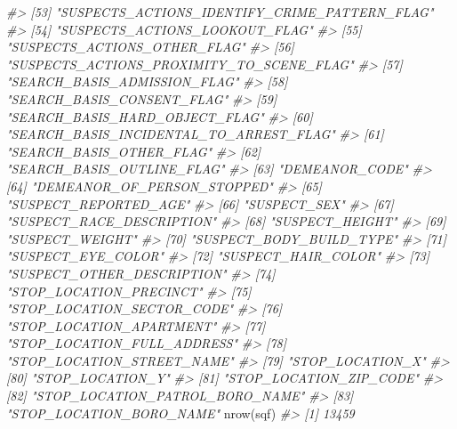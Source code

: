 \documentclass[
]{krantz}
\makeatletter
\newenvironment{Shaded}{\begin{snugshade}}{\end{snugshade}}
\newcommand{\CommentTok}[1]{\textcolor[rgb]{0.37,0.37,0.37}{\textit{#1}}}
\newcommand{\FunctionTok}[1]{\textcolor[rgb]{0,0,0}{#1}}
\newcommand{\NormalTok}[1]{#1}
\newenvironment{kframe}{%
\medskip{}
\setlength{\fboxsep}{.8em}
 \def\at@end@of@kframe{}%
 \ifinner\ifhmode%
  \def\at@end@of@kframe{\end{minipage}}%
  \begin{minipage}{\columnwidth}%
 \fi\fi%
 \def\FrameCommand##1{\hskip\@totalleftmargin \hskip-\fboxsep
 \colorbox{shadecolor}{##1}\hskip-\fboxsep
     \hskip-\linewidth \hskip-\@totalleftmargin \hskip\columnwidth}%
 \MakeFramed {\advance\hsize-\width
   \@totalleftmargin\z@ \linewidth\hsize
   \@setminipage}}%
 {\par\unskip\endMakeFramed%
 \at@end@of@kframe}
\renewenvironment{Shaded}{\begin{kframe}}{\end{kframe}}
\makeatother
\begin{document}
\begin{Shaded}
\begin{Highlighting}[]
\CommentTok{\#\textgreater{} [53] "SUSPECTS\_ACTIONS\_IDENTIFY\_CRIME\_PATTERN\_FLAG"              }
\CommentTok{\#\textgreater{} [54] "SUSPECTS\_ACTIONS\_LOOKOUT\_FLAG"                             }
\CommentTok{\#\textgreater{} [55] "SUSPECTS\_ACTIONS\_OTHER\_FLAG"                               }
\CommentTok{\#\textgreater{} [56] "SUSPECTS\_ACTIONS\_PROXIMITY\_TO\_SCENE\_FLAG"                  }
\CommentTok{\#\textgreater{} [57] "SEARCH\_BASIS\_ADMISSION\_FLAG"                               }
\CommentTok{\#\textgreater{} [58] "SEARCH\_BASIS\_CONSENT\_FLAG"                                 }
\CommentTok{\#\textgreater{} [59] "SEARCH\_BASIS\_HARD\_OBJECT\_FLAG"                             }
\CommentTok{\#\textgreater{} [60] "SEARCH\_BASIS\_INCIDENTAL\_TO\_ARREST\_FLAG"                    }
\CommentTok{\#\textgreater{} [61] "SEARCH\_BASIS\_OTHER\_FLAG"                                   }
\CommentTok{\#\textgreater{} [62] "SEARCH\_BASIS\_OUTLINE\_FLAG"                                 }
\CommentTok{\#\textgreater{} [63] "DEMEANOR\_CODE"                                             }
\CommentTok{\#\textgreater{} [64] "DEMEANOR\_OF\_PERSON\_STOPPED"                                }
\CommentTok{\#\textgreater{} [65] "SUSPECT\_REPORTED\_AGE"                                      }
\CommentTok{\#\textgreater{} [66] "SUSPECT\_SEX"                                               }
\CommentTok{\#\textgreater{} [67] "SUSPECT\_RACE\_DESCRIPTION"                                  }
\CommentTok{\#\textgreater{} [68] "SUSPECT\_HEIGHT"                                            }
\CommentTok{\#\textgreater{} [69] "SUSPECT\_WEIGHT"                                            }
\CommentTok{\#\textgreater{} [70] "SUSPECT\_BODY\_BUILD\_TYPE"                                   }
\CommentTok{\#\textgreater{} [71] "SUSPECT\_EYE\_COLOR"                                         }
\CommentTok{\#\textgreater{} [72] "SUSPECT\_HAIR\_COLOR"                                        }
\CommentTok{\#\textgreater{} [73] "SUSPECT\_OTHER\_DESCRIPTION"                                 }
\CommentTok{\#\textgreater{} [74] "STOP\_LOCATION\_PRECINCT"                                    }
\CommentTok{\#\textgreater{} [75] "STOP\_LOCATION\_SECTOR\_CODE"                                 }
\CommentTok{\#\textgreater{} [76] "STOP\_LOCATION\_APARTMENT"                                   }
\CommentTok{\#\textgreater{} [77] "STOP\_LOCATION\_FULL\_ADDRESS"                                }
\CommentTok{\#\textgreater{} [78] "STOP\_LOCATION\_STREET\_NAME"                                 }
\CommentTok{\#\textgreater{} [79] "STOP\_LOCATION\_X"                                           }
\CommentTok{\#\textgreater{} [80] "STOP\_LOCATION\_Y"                                           }
\CommentTok{\#\textgreater{} [81] "STOP\_LOCATION\_ZIP\_CODE"                                    }
\CommentTok{\#\textgreater{} [82] "STOP\_LOCATION\_PATROL\_BORO\_NAME"                            }
\CommentTok{\#\textgreater{} [83] "STOP\_LOCATION\_BORO\_NAME"}
\FunctionTok{nrow}\NormalTok{(sqf)}
\CommentTok{\#\textgreater{} [1] 13459}
\end{Highlighting}
\end{Shaded}
\end{document}
